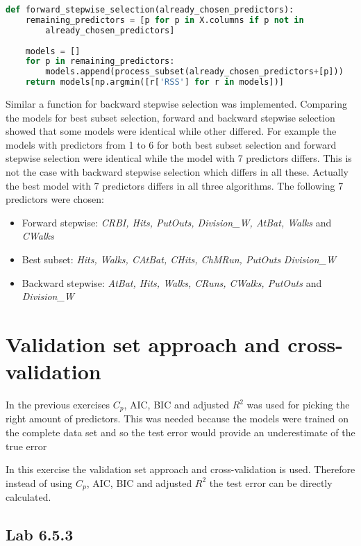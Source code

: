 \begin{lstlisting}[language=Python, label=lst:forwardselection, caption=Function for forward stepwise selection]
def forward_stepwise_selection(already_chosen_predictors):
	remaining_predictors = [p for p in X.columns if p not in
		already_chosen_predictors]
		
	models = []
	for p in remaining_predictors:
		models.append(process_subset(already_chosen_predictors+[p]))
	return models[np.argmin([r['RSS'] for r in models])]
\end{lstlisting}

Similar a function for backward stepwise selection was implemented. Comparing the models for best subset selection, forward and backward stepwise selection showed that some models were identical while other differed. For example the models with predictors from 1 to 6 for both best subset selection and forward stepwise selection were identical while the model with 7 predictors differs. This is not the case with backward stepwise selection which differs in all these. Actually the best model with 7 predictors differs in all three algorithms. The following 7 predictors were chosen:

\begin{itemize}
\item Forward stepwise: \emph{CRBI, Hits, PutOuts, Division\_W, AtBat, Walks} and \emph{CWalks}
\item Best subset: \emph{Hits, Walks, CAtBat, CHits, ChMRun, PutOuts} \emph{Division\_W}
\item Backward stepwise: \emph{AtBat, Hits, Walks, CRuns, CWalks, PutOuts} and \emph{Division\_W}
\end{itemize}

\section{Validation set approach and cross-validation}
In the previous exercises $C_p$, AIC, BIC and adjusted $R^2$ was used for picking the right amount of predictors. This was needed because the models were trained on the complete data set and so the test error would provide an underestimate of the true error

In this exercise the validation set approach and cross-validation is used. Therefore instead of using $C_p$, AIC, BIC and adjusted $R^2$ the test error can be directly calculated. 
\subsection{Lab 6.5.3 }

